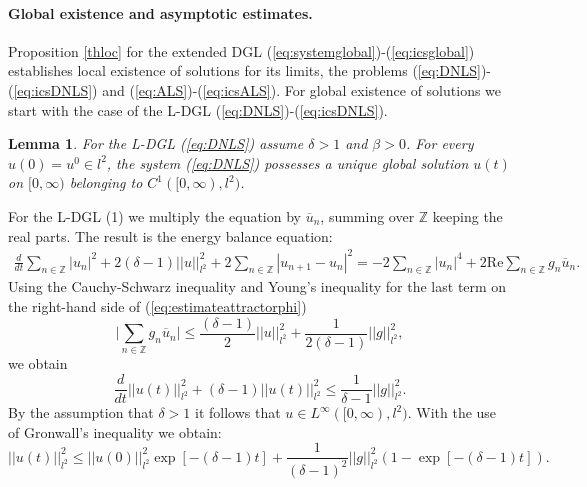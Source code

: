 \documentclass[preprintnumbers,amsmath,amssymb]{revtex4}
\newtheorem{lemma}{Lemma}[section]
\begin{document}
\paragraph{Global existence and asymptotic estimates.}
Proposition \ref{thloc} for the extended DGL (\ref{eq:systemglobal})-(\ref{eq:icsglobal}) establishes local existence of solutions for its limits,  the problems (\ref{eq:DNLS})-(\ref{eq:icsDNLS}) and (\ref{eq:ALS})-(\ref{eq:icsALS}).  For global existence of solutions we start with the case of the L-DGL (\ref{eq:DNLS})-(\ref{eq:icsDNLS}).
%
\begin{lemma}
\label{Lemma:unique}		
For the L-DGL (\ref{eq:DNLS}) assume $\delta>1$ and $\beta>0$. For every $u(0)=u^0\in l^2$, 
the system (\ref{eq:DNLS}) possesses a unique global solution $u(t)$ on $[0,\infty)$ belonging to
$C^1([0,\infty),l^2)$.
%
\end{lemma}
%
%
For the L-DGL (1) we multiply the equation by $\overline{u}_n$, summing over $\mathbb{Z}$ keeping the real parts. The result is the energy balance equation:
\begin{eqnarray}
  \frac{d}{dt}\sum_{n\in {\mathbb{Z}}}|u_n|^2+2(\delta-1)||u||_{l^2}^2+2\sum_{n\in\mathbb{Z}}|u_{n+1}-u_n|^2=-2\sum_{n\in {\mathbb{Z}}} |u_n|^4+2\mathrm{Re}\sum_{n\in\mathbb{Z}}g_n\overline{u}_n.
  \label{eq:estimateattractorphi}
 \end{eqnarray}
  Using the Cauchy-Schwarz inequality and Young's inequality for the last term on the right-hand side of (\ref{eq:estimateattractorphi}) 
\begin{equation}
 \bigg|\sum_{n\in\mathbb{Z}}g_n\overline{u}_n\bigg|\leq \frac{(\delta-1)}{2}||u||^2_{l^2}+\frac{1}{2(\delta-1)}||g||^2_{l^2},
\end{equation}
 we obtain
\begin{equation}
  \frac{d}{dt}|| u(t)||_{l^2}^2 +(\delta -1)|| u(t)||_{l^2}^2\le \frac{1}{\delta-1}|| g||_{l^2}^2.\label{eq:DNLSl2above}
\end{equation}
By the assumption that $\delta>1$ it follows that $u \in L^{\infty}([0,\infty),l^2)$. 
With the use of Gronwall's inequality we obtain:
\begin{equation}
 || u(t)||_{l^2}^2\le || u(0)||_{l^2}^2\exp[-(\delta-1) t]+\frac{1}{(\delta-1)^2}|| g||_{l^2}^2\left(1-\exp[-(\delta-1) t]\right).
\end{equation}
\end{document}
